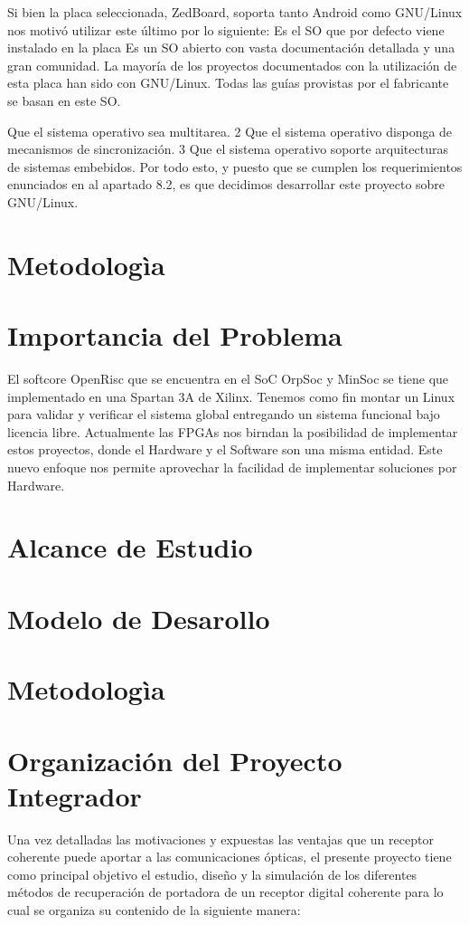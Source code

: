 Si bien la placa seleccionada, ZedBoard, soporta tanto Android como GNU/Linux nos motivó utilizar este último por lo siguiente:
Es el SO que por defecto viene instalado en la placa
Es un SO abierto con vasta documentación detallada y una gran comunidad.
La mayoría de los proyectos documentados con la utilización de esta placa han sido con GNU/Linux.
Todas las guías provistas por el fabricante se basan en este SO.

Que el sistema operativo sea multitarea.
2
Que el sistema operativo disponga de mecanismos de sincronización. 3 Que el sistema operativo soporte arquitecturas de sistemas embebidos.
Por todo esto, y puesto que se cumplen los requerimientos enunciados en al apartado 8.2, es que decidimos desarrollar este proyecto sobre GNU/Linux.

\section{Metodologìa}



\section{Importancia del Problema}

El softcore OpenRisc  que se encuentra en el SoC OrpSoc y MinSoc se tiene que implementado en una Spartan 3A de Xilinx. Tenemos como fin montar un Linux para validar y verificar el sistema global entregando un sistema funcional bajo licencia libre.
Actualmente las FPGAs nos birndan la posibilidad de implementar estos proyectos, donde el Hardware y el Software son una misma entidad. Este nuevo enfoque nos permite aprovechar la facilidad de implementar soluciones por Hardware.

\section{Alcance de Estudio}
\section{Modelo de Desarollo}
\section{Metodologìa}



 \section{Organización del Proyecto Integrador}

 Una vez detalladas  las motivaciones y expuestas las  ventajas que un
 receptor  coherente puede  aportar a  las comunicaciones  ópticas, el
 presente proyecto tiene como  principal objetivo el estudio, diseño y
 la simulación de los  diferentes métodos de recuperación de portadora
 de un receptor digital coherente para lo cual se organiza
 su contenido de la siguiente manera:\\



